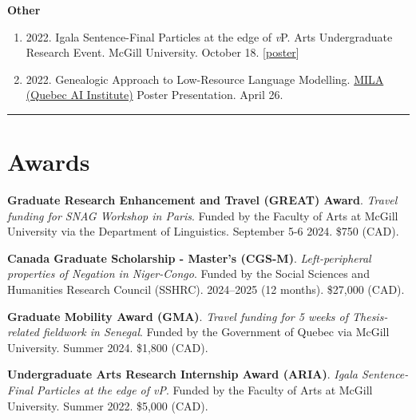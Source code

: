 \documentclass[margin,line]{resume}
\begin{document}
\begin{resume}
\begin{comment}
		\item[] {2022. \href{https://mcling.blogs.mcgill.ca/2022/03/27/mull-lab-03-30-brandon-chaperon/}{Igala's Dual Negation}. \href{https://mull-lab.org/}{MULL Lab} meeting. McGill University. March 30.}
	\end{enumerate}
\end{comment}

	\textbf{Other}
	\begin{enumerate}[-, leftmargin=1em, topsep=2pt]
		\item[] {2022. Igala Sentence-Final Particles at the edge of \textit{v}P. Arts Undergraduate Research Event. McGill University. October 18. [\href{https://www.mcgill.ca/arts-internships/files/arts-internships/brandon_chaperon.pdf}{poster}]}

		\item[] {2022. Genealogic Approach to Low-Resource Language Modelling. \href{https://mila.quebec/en/}{MILA (Quebec AI Institute)} Poster Presentation. April 26.}

	\end{enumerate}


	\vspace{-0.9em}\rule{\textwidth}{0.4pt}


		\vspace{-0.5em}

		\section{\mysidestyle Awards}

	
		{\textbf{Graduate Research Enhancement and Travel (GREAT) Award}. \textit{Travel funding for SNAG Workshop in Paris}. Funded by the Faculty of Arts at McGill University via the Department of Linguistics. September 5-6 2024. \$750 (CAD).}
	
		{\textbf{Canada Graduate Scholarship - Master's (CGS-M)}. \textit{Left-peripheral properties of Negation in Niger-Congo}. Funded by the Social Sciences and Humanities Research Council (SSHRC). 2024--2025 (12 months). \$27,000 (CAD).}
		
		{\textbf{Graduate Mobility Award (GMA)}. \textit{Travel funding for 5 weeks of Thesis-related fieldwork in Senegal}. Funded by the Government of Quebec via McGill University. %
		Summer 2024. \$1,800 (CAD).}	
		
		{\textbf{Undergraduate Arts Research Internship Award (ARIA)}. \textit{Igala Sentence-Final Particles at the edge of \textit{v}P}. Funded by the Faculty of Arts at McGill University. %
		Summer 2022. \$5,000 (CAD).}
	

\end{resume}
\end{document}
